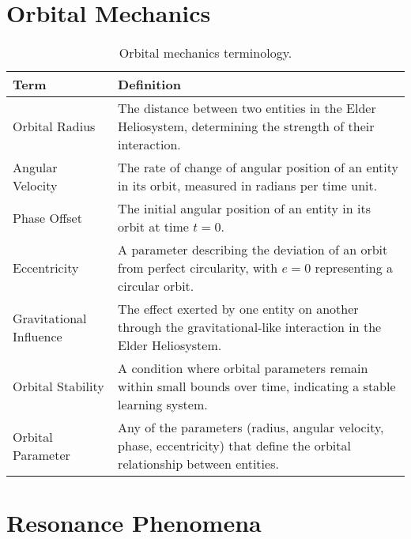 \section{Orbital Mechanics}

\begin{table}[h]
\centering
\begin{tabular}{|l|p{12cm}|}
\hline
\textbf{Term} & \textbf{Definition} \\
\hline
Orbital Radius & The distance between two entities in the Elder Heliosystem, determining the strength of their interaction. \\
\hline
Angular Velocity & The rate of change of angular position of an entity in its orbit, measured in radians per time unit. \\
\hline
Phase Offset & The initial angular position of an entity in its orbit at time $t=0$. \\
\hline
Eccentricity & A parameter describing the deviation of an orbit from perfect circularity, with $e=0$ representing a circular orbit. \\
\hline
Gravitational Influence & The effect exerted by one entity on another through the gravitational-like interaction in the Elder Heliosystem. \\
\hline
Orbital Stability & A condition where orbital parameters remain within small bounds over time, indicating a stable learning system. \\
\hline
Orbital Parameter & Any of the parameters (radius, angular velocity, phase, eccentricity) that define the orbital relationship between entities. \\
\hline
\end{tabular}
\caption{Orbital mechanics terminology.}
\label{tab:orbital_terminology}
\end{table}

\section{Resonance Phenomena}

